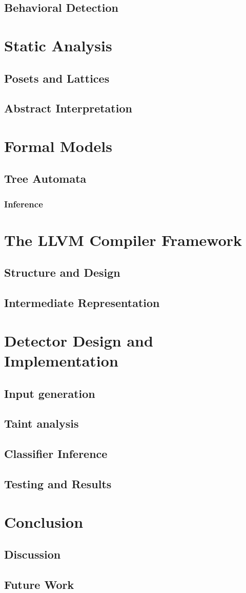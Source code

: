     \section{Behavioral Detection}
\chapter{Static Analysis}
\label{ch_s_analysis}
    \section{Posets and Lattices}
    \section{Abstract Interpretation}
\chapter{Formal Models}
\label{ch_models}
    \section{Tree Automata}
        \subsection{Inference}
\chapter{The LLVM Compiler Framework}
\label{ch_llvm}
    \section{Structure and Design}
    \section{Intermediate Representation}
\chapter{Detector Design and Implementation}
\label{ch_detector}
    \section{Input generation}
    \section{Taint analysis}
    \section{Classifier Inference}
    \section{Testing and Results}
\chapter{Conclusion}
\label{ch_conclusion}
    \section{Discussion}
    \section{Future Work}

